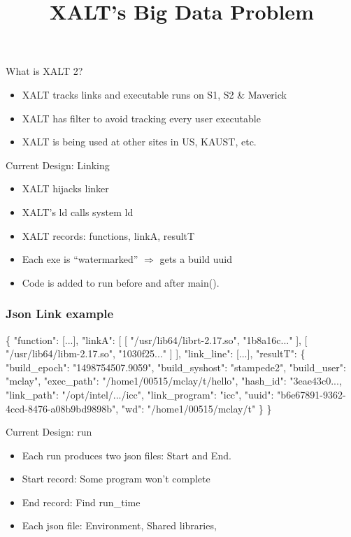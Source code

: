 \documentclass{beamer}
\begin{document}
\title[XALT]{XALT's Big Data Problem}
\frame{\titlepage} 

\begin{frame}{What is XALT 2?}
  \begin{itemize}
    \item XALT tracks links and executable runs on S1, S2 \& Maverick
    \item XALT has filter to avoid tracking every user executable
    \item XALT is being used at other sites in US, KAUST, etc.
  \end{itemize}
\end{frame}

\begin{frame}{Current Design: Linking}
  \begin{itemize}
    \item XALT hijacks linker
    \item XALT's ld calls system ld
    \item XALT records: functions, linkA, resultT
    \item Each exe is ``watermarked'' $\Rightarrow$ gets a build uuid
    \item Code is added to run before and after main().
  \end{itemize}
\end{frame}

\begin{frame}[fragile]
    \frametitle{Json Link example }
    {\tiny
\begin{semiverbatim}
\{
    "function": [...],
    "linkA": [
        [ "/usr/lib64/librt-2.17.so", "1b8a16c..."  ],
        [ "/usr/lib64/libm-2.17.so",  "1030f25..."  ]
    ],
    "link_line": [...],
    "resultT": \{
        "build_epoch": "1498754507.9059",
        "build_syshost": "stampede2",
        "build_user": "mclay",
        "exec_path": "/home1/00515/mclay/t/hello",
        "hash_id": "3eae43c0...,
        "link_path": "/opt/intel/.../icc",
        "link_program": "icc",
        "uuid": "b6e67891-9362-4ccd-8476-a08b9bd9898b",
        "wd": "/home1/00515/mclay/t"
    \}
\}
\end{semiverbatim}
    }
\end{frame}

\begin{frame}{Current Design: run}
  \begin{itemize}
    \item Each run produces two json files: Start and End.
    \item Start record: Some program won't complete
    \item End record: Find run\_time
    \item Each json file: Environment, Shared libraries,
  \end{itemize}
\end{frame}
\end{document}
